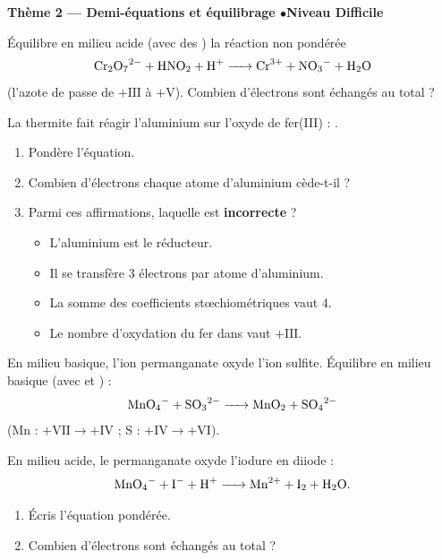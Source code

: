 \documentclass[11pt,a4paper]{article}
\begin{document}
\begin{center}\color{primarydark}\large\bfseries Thème 2 — Demi-équations et équilibrage \quad$\bullet$\quad Niveau Difficile\end{center}

\begin{exo}
Équilibre en milieu acide (avec des ) la réaction non pondérée
\[
\ce{Cr2O7^{2-} + HNO2 + H+ -> Cr^{3+} + NO3^- + H2O}
\]
(l'azote de  passe de $+\mathrm{III}$ à $+\mathrm{V}$). Combien d'électrons sont échangés au
total ?
\end{exo}

\begin{exo}
La thermite fait réagir l'aluminium sur l'oxyde de fer(III) : .
\begin{enumerate}[label=\alph*)]
  \item Pondère l'équation.
  \item Combien d'électrons chaque atome d'aluminium cède-t-il ?
  \item Parmi ces affirmations, laquelle est \textbf{incorrecte} ?
    \begin{itemize}[leftmargin=1.4em,topsep=1pt,itemsep=0pt]
      \item[(A)] L'aluminium est le réducteur.
      \item[(B)] Il se transfère 3 électrons par atome d'aluminium.
      \item[(C)] La somme des coefficients stœchiométriques vaut 4.
      \item[(D)] Le nombre d'oxydation du fer dans  vaut $+\mathrm{III}$.
    \end{itemize}
\end{enumerate}
\end{exo}

\begin{exo}
En milieu basique, l'ion permanganate oxyde l'ion sulfite. Équilibre en milieu basique (avec
 et ) :
\[
\ce{MnO4^- + SO3^{2-} -> MnO2 + SO4^{2-}}
\]
(Mn : $+\mathrm{VII}\to+\mathrm{IV}$ ; S : $+\mathrm{IV}\to+\mathrm{VI}$).
\end{exo}

\begin{exo}
En milieu acide, le permanganate oxyde l'iodure en diiode :
\[
\ce{MnO4^- + I^- + H+ -> Mn^{2+} + I2 + H2O}.
\]
\begin{enumerate}[label=\alph*)]
  \item Écris l'équation pondérée.
  \item Combien d'électrons sont échangés au total ?
\end{enumerate}
\end{exo}
\end{document}

